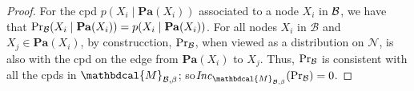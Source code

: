 \documentclass{article}
\theoremstyle{plain}
\theoremstyle{definition}
\theoremstyle{remark}
\newcommand{\dg}[1]{\mathbdcal{#1}}
\newcommand\Pa{\mathbf{Pa}}
\newcommand\Inc{\mathit{Inc}}
\newcommand{\PDGof}[1]{{\dg M}_{#1}}
\numberwithin{equation}{section}
\begin{document}
\begin{proof}
  For the cpd $p(X_i \mid \Pa(X_i))$ associated to a node $X_i$ in 
$\cal B$, we have that $\Pr_{\cal B}(X_i
\mid \Pa(X_i)) = p(X_i \mid \Pa(X_i))$.  
For all nodes $X_i$ in $\mathcal B$ and $X_j \in \Pa(X_i)$, 
by construcction, $\Pr_{\cal B}$, when viewed as a distribution on
$\mathcal N$, is also with the cpd on the edge from $\Pa(X_i)$ to
$X_j$.
Thus, $\Pr_{\cal B}$ is consistent with all the cpds in
$\PDGof{\mathcal B, \beta}$;
so$\Inc_{\PDGof{\mathcal B,\beta}}(\Pr_{\cal B}) = 0$.


\end{proof}
\end{document}

